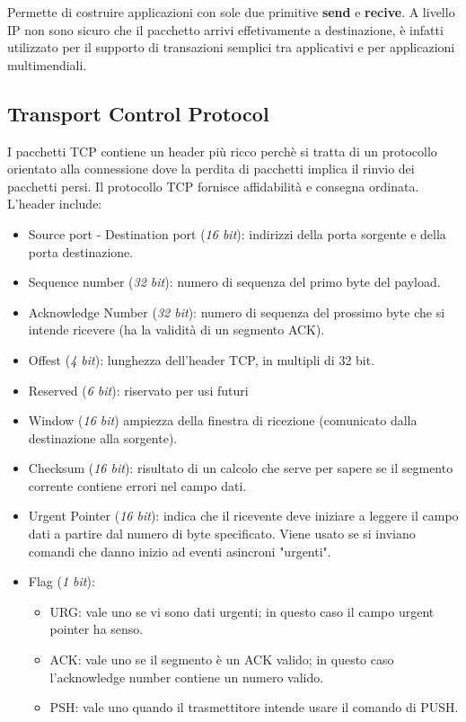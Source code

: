 \documentclass[oneside,a4paper,11pt]{book}
\theoremstyle{italicstyle}
\theoremstyle{normStyle}
\begin{document}
Permette di costruire applicazioni con sole due primitive \textbf{send} e 
\textbf{recive}.
A livello IP non sono sicuro che il pacchetto arrivi effetivamente a 
destinazione, è infatti utilizzato per il supporto di transazioni semplici tra applicativi
e per applicazioni multimendiali.
\subsection{Transport Control Protocol}
I pacchetti TCP contiene un header più ricco perchè si tratta di un protocollo
orientato alla connessione dove la perdita di pacchetti implica il rinvio dei pacchetti persi.
Il protocollo TCP fornisce affidabilità e consegna ordinata.
L'header include:
\begin{itemize}
  \item Source port - Destination port (\textit{16 bit}): indirizzi della porta
  sorgente e della porta destinazione.
  \item Sequence number (\textit{32 bit}): numero di sequenza del primo byte del payload.
  \item Acknowledge Number (\textit{32 bit}): numero di sequenza del prossimo byte che si intende 
  ricevere (ha la validità di un segmento ACK).
  \item Offest (\textit{4 bit}): lunghezza dell'header TCP, in multipli di 32 bit.
  \item Reserved (\textit{6 bit}): riservato per usi futuri
  \item Window (\textit{16 bit}) ampiezza della finestra di ricezione (comunicato
  dalla destinazione alla sorgente).
  \item Checksum (\textit{16 bit}): risultato di un calcolo che serve per sapere se
  il segmento corrente contiene errori nel campo dati.
  \item Urgent Pointer (\textit{16 bit}): indica che il ricevente deve iniziare a 
  leggere il campo dati a partire dal numero di byte specificato.
  Viene usato se si inviano 
  comandi che danno inizio ad eventi asincroni "urgenti".
  \item Flag (\textit{1 bit}):
  \begin{itemize}
    \item URG: vale uno se vi sono dati urgenti; 
    in questo caso il campo urgent pointer ha senso.
    \item ACK: vale uno se il segmento è un ACK valido; 
    in questo caso l’acknowledge number contiene un numero valido.
    \item PSH: vale uno quando il trasmettitore intende usare il comando di PUSH.

\end{itemize}
\end{itemize}
\end{document}
